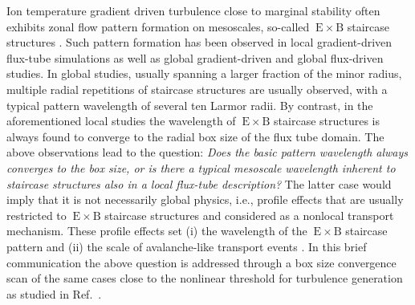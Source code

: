 \documentclass[aip, amsmath, amssymb, reprint, twocolumn, floatfix]{revtex4-1}
\newcommand{\exb}{\mathrm{\:E}\times\mathrm{B}}
\begin{document}
Ion temperature gradient driven turbulence close to marginal stability often exhibits zonal flow pattern formation on mesoscales, so-called $\exb$ staircase structures \cite{pradalier2010}.
Such pattern formation has been observed in local gradient-driven flux-tube simulations \cite{peeters2016, weikl2017, rath2021} as well as global gradient-driven \cite{mcmillan2009, villard2013, seo2022} and global flux-driven \cite{pradalier2010, pradalier2015, wang2020, kim2022, kishimoto2023} studies. 
In global studies, usually spanning a larger fraction of the minor radius, multiple radial repetitions of staircase structures are usually observed, with a typical pattern wavelength of several ten Larmor radii.
By contrast, in the aforementioned local studies the wavelength of $\exb$ staircase structures is always found to converge to the radial box size of the flux tube domain.
The above observations lead to the question: 
\textit{Does the basic pattern wavelength always converges to the box size, or is there a typical mesoscale wavelength inherent to staircase structures also in a local flux-tube description?}
The latter case would imply that it is not necessarily global physics, i.e., profile effects that are usually restricted to $\exb$ staircase structures and considered as a nonlocal transport mechanism. These profile effects set (i) the wavelength of the $\exb$ staircase pattern and (ii) the scale of avalanche-like transport events \cite{pradalier2010}. 
In this brief communication the above question is addressed through a box size convergence scan of the same cases close to the nonlinear threshold for turbulence generation as studied in Ref.~\cite{peeters2016}.\bigskip

\end{document}
